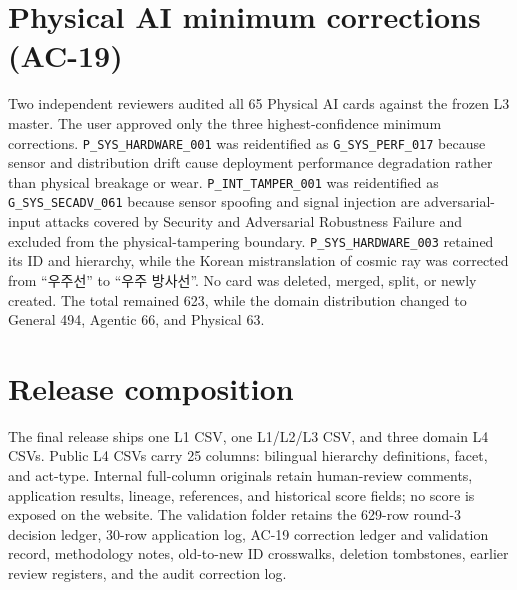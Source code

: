 \documentclass[11pt,a4paper]{article}
\begin{document}
\par\section{Physical AI minimum corrections (AC-19)}
Two independent reviewers audited all 65 Physical AI cards against the frozen L3 master. The user approved only the three highest-confidence minimum corrections. \texttt{P\_SYS\_HARDWARE\_001} was reidentified as \texttt{G\_SYS\_PERF\_017} because sensor and distribution drift cause deployment performance degradation rather than physical breakage or wear. \texttt{P\_INT\_TAMPER\_001} was reidentified as \texttt{G\_SYS\_SECADV\_061} because sensor spoofing and signal injection are adversarial-input attacks covered by Security and Adversarial Robustness Failure and excluded from the physical-tampering boundary. \texttt{P\_SYS\_HARDWARE\_003} retained its ID and hierarchy, while the Korean mistranslation of cosmic ray was corrected from ``우주선'' to ``우주 방사선''. No card was deleted, merged, split, or newly created. The total remained 623, while the domain distribution changed to General 494, Agentic 66, and Physical 63.
\par\section{Release composition}
The final release ships one L1 CSV, one L1/L2/L3 CSV, and three domain L4 CSVs. Public L4 CSVs carry 25 columns: bilingual hierarchy definitions, facet, and act-type. Internal full-column originals retain human-review comments, application results, lineage, references, and historical score fields; no score is exposed on the website. The validation folder retains the 629-row round-3 decision ledger, 30-row application log, AC-19 correction ledger and validation record, methodology notes, old-to-new ID crosswalks, deletion tombstones, earlier review registers, and the audit correction log.
\end{document}
